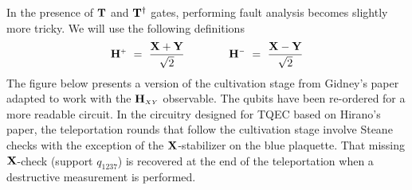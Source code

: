 \documentclass{article}
\newcommand{\Sup}[1]{^{\scriptscriptstyle #1}}
\newcommand{\sub}[1]{_{\scriptscriptstyle #1}}
\newcommand{\Op}[1]{{\bf #1}}
\begin{document}
	In the presence of $\Op{T}$ and $\Op{T}^{\dagger}$ gates, performing fault analysis becomes slightly more tricky. We will use the following definitions
	\begin{equation*}
		\Op{H}\Sup{+} ~=~ \frac{\Op{X} + \Op{Y}}{\sqrt{2}}
		\qquad\qquad
		\Op{H}\Sup{-} ~=~ \frac{\Op{X} - \Op{Y}}{\sqrt{2}}
	\end{equation*}
	The figure below presents a version of the cultivation stage from Gidney's paper adapted to work with the $\Op{H}\sub{XY}$ observable. The qubits have been re-ordered for a more readable circuit. In the circuitry designed for TQEC based on Hirano's paper, the teleportation rounds that follow the cultivation stage involve Steane checks with the exception of the $\Op{X}$-stabilizer on the blue plaquette. That missing $\Op{X}$-check (support $q\sub{1237}$) is recovered at the end of the teleportation when a destructive measurement is performed.
	\vspace{-0.4cm}
\end{document}
